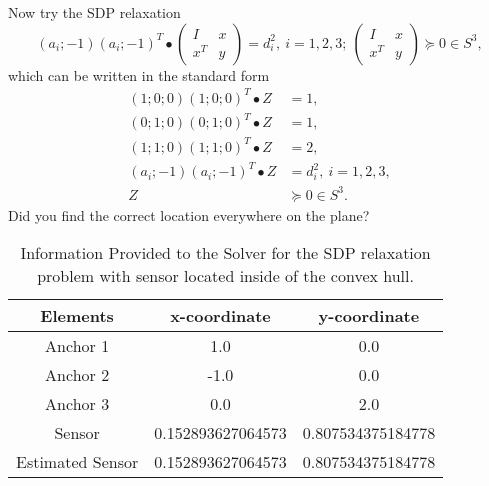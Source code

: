 \documentclass[12pt,letterpaper]{article}
\begin{document}
\newpage
Now try the SDP relaxation \\
\[(a_i;-1)(a_i;-1)^T\bullet \left(\begin{array}{cc} I & x\\ x^T & y\end{array}\right) = d^2_i,\ i=1,2,3;\ \left(\begin{array}{cc} I & x\\ x^T & y\end{array}\right)\succeq 0\in S^3,\]
which can be written in the standard form
\[\begin{array}{cl}
(1;0;0)(1;0;0)^T\bullet Z &=1,\\
(0;1;0)(0;1;0)^T\bullet Z& =1,\\
(1;1;0)(1;1;0)^T\bullet Z& =2,\\
(a_i;-1)(a_i;-1)^T\bullet Z &= d^2_i,\ i=1,2,3,\\
Z &\succeq 0\in S^3.
\end{array}
\]
Did you find the correct location everywhere on the plane?
~\\

\begin{table}[h]
\begin{center}
\caption{Information Provided to the Solver for the SDP relaxation problem with sensor located inside of the convex hull.}
\vspace{.3cm}
\label{my-label}
\begin{tabular}{|c|c|c|}
\hline
        Elements  & x-coordinate & y-coordinate \\ \hline
               Anchor 1  &  1.0 &  0.0\\ 
       Anchor 2  &  -1.0 &  0.0\\ 
       Anchor 3  &  0.0 &  2.0\\ 
       Sensor  &   0.152893627064573 & 0.807534375184778 \\ 
       Estimated Sensor  &  0.152893627064573 &  0.807534375184778\\ \hline
\hline
\end{tabular}
\end{center}
\end{table}
\end{document}
